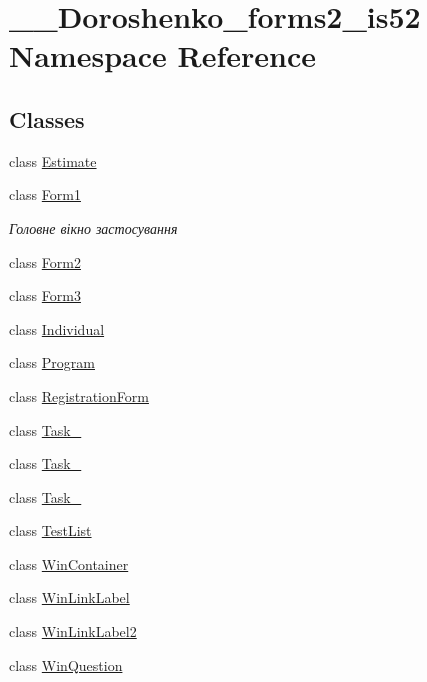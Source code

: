 \hypertarget{namespace__7___doroshenko__forms2__is52}{}\section{\+\_\+\_\+\+Doroshenko\+\_\+forms2\+\_\+is52 Namespace Reference}
\label{namespace__7___doroshenko__forms2__is52}
\subsection*{Classes}
\begin{DoxyCompactItemize}
\item 
class \hyperlink{class__7___doroshenko__forms2__is52_1_1_estimate}{Estimate}
\item 
class \hyperlink{class__7___doroshenko__forms2__is52_1_1_form1}{Form1}
\begin{DoxyCompactList}\small\item\em Головне вікно застосування \end{DoxyCompactList}\item 
class \hyperlink{class__7___doroshenko__forms2__is52_1_1_form2}{Form2}
\item 
class \hyperlink{class__7___doroshenko__forms2__is52_1_1_form3}{Form3}
\item 
class \hyperlink{class__7___doroshenko__forms2__is52_1_1_individual}{Individual}
\item 
class \hyperlink{class__7___doroshenko__forms2__is52_1_1_program}{Program}
\item 
class \hyperlink{class__7___doroshenko__forms2__is52_1_1_registration_form}{Registration\+Form}
\item 
class \hyperlink{class__7___doroshenko__forms2__is52_1_1_task__3}{Task\+\_}
\item 
class \hyperlink{class__7___doroshenko__forms2__is52_1_1_task__4}{Task\+\_}
\item 
class \hyperlink{class__7___doroshenko__forms2__is52_1_1_task__9}{Task\+\_}
\item 
class \hyperlink{class__7___doroshenko__forms2__is52_1_1_test_list}{Test\+List}
\item 
class \hyperlink{class__7___doroshenko__forms2__is52_1_1_win_container}{Win\+Container}
\item 
class \hyperlink{class__7___doroshenko__forms2__is52_1_1_win_link_label}{Win\+Link\+Label}
\item 
class \hyperlink{class__7___doroshenko__forms2__is52_1_1_win_link_label2}{Win\+Link\+Label2}
\item 
class \hyperlink{class__7___doroshenko__forms2__is52_1_1_win_question}{Win\+Question}
\end{DoxyCompactItemize}
